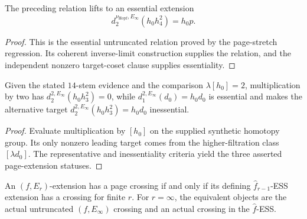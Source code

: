 \begin{proposition}
  \label{prop:hopf-einfty-page-extension}
  \notready
  The preceding relation lifts to an essential extension
  \[
    d_2^{\nu_{\mathrm{Hopf}},E_\infty}(h_0h_4^2)=h_0p.
  \]
\end{proposition}

\begin{proof}
  This is the essential untruncated relation proved by the page-stretch
  regression.  Its coherent inverse-limit construction supplies the relation,
  and the independent nonzero target-coset clause supplies essentiality.
\end{proof}

\begin{proposition}
  \label{prop:two-page-extension-regression}
  \notready
  Given the stated $14$-stem evidence and the comparison
  $\lambda[h_0]=2$, multiplication by two has
  $d_2^{2,E_\infty}(h_0h_3^2)=0$, while
  $d_1^{2,E_\infty}(d_0)=h_0d_0$ is essential and makes the alternative target
  $d_2^{2,E_\infty}(h_0h_3^2)=h_0d_0$ inessential.
\end{proposition}

\begin{proof}
  Evaluate multiplication by $[h_0]$ on the supplied synthetic homotopy group.
  Its only nonzero leading target comes from the higher-filtration class
  $[\lambda d_0]$.  The representative and inessentiality criteria yield the
  three asserted page-extension statuses.
\end{proof}

\begin{proposition}
  \label{prop:page-crossing-iff-synthetic-crossing}
  \notready
  An $(f,E_r)$-extension has a page crossing if and only if its defining
  $\widehat f_{r-1}$-ESS extension has a crossing for finite $r$.  For
  $r=\infty$, the equivalent objects are the actual untruncated
  $(f,E_\infty)$ crossing and an actual crossing in the $\widehat f$-ESS.
\end{proposition}

